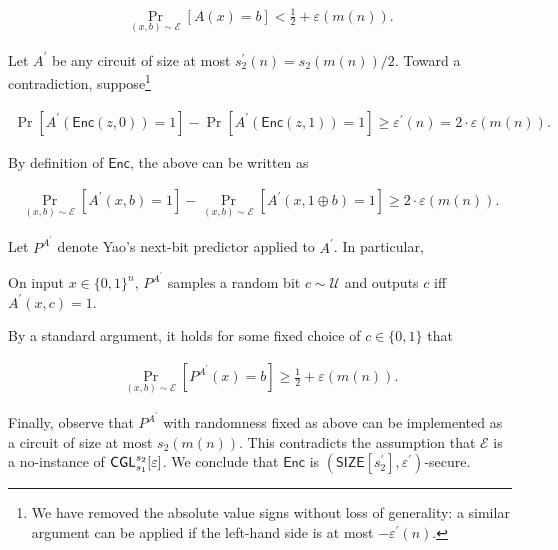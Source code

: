 \documentclass[10pt,a4paper]{article}
\begin{document}
\[\begin{gathered}
\Pr_{(x,b)\sim\mathcal{E}}[A(x)=b]<\frac{1}{2}+\varepsilon(m(n)).
\end{gathered}\]


Let $A^{\prime}$ be any circuit of size at most $s_{2}^{\prime}(n)=s_{2}(m(n))/2$. Toward a contradiction, suppose\footnote{We have removed the absolute value signs without loss of generality: a similar argument can be applied if the left-hand side is at most $-\varepsilon^{\prime}(n)$.}\par


\[\begin{gathered}
\Pr[A^{\prime}({\mathsf{Enc}}(z,0))=1]-\Pr[A^{\prime}({\mathsf{Enc}}(z,1))=1]\geq\varepsilon^{\prime}(n)=2\cdot\varepsilon(m(n)).
\end{gathered}\]


By definition of ${\mathsf{Enc}}$, the above can be written as\par


\[\begin{gathered}
\Pr_{(x,b)\sim\mathcal{E}}[A^{\prime}(x,b)=1]-\Pr_{(x,b)\sim\mathcal{E}}[A^{\prime}(x,1\oplus b)=1]\geq 2\cdot\varepsilon(m(n)).
\end{gathered}\]


Let $P^{A^{\prime}}$ denote Yao’s next-bit predictor applied to $A^{\prime}$. In particular,\par



On input $x\in\{0,1\}^{n}$, $P^{A^{\prime}}$ samples a random bit $c\sim\mathcal{U}$ and outputs $c$ iff $A^{\prime}(x,c)=1$.\par



By a standard argument, it holds for some fixed choice of $c\in\{0,1\}$ that\par


\[\begin{gathered}
\Pr_{(x,b)\sim\mathcal{E}}[P^{A^{\prime}}(x)=b]\geq\frac{1}{2}+\varepsilon(m(n)).
\end{gathered}\]


Finally, observe that $P^{A^{\prime}}$ with randomness fixed as above can be implemented as a circuit of size at most $s_{2}(m(n))$. This contradicts the assumption that $\mathcal{E}$ is a no-instance of ${\sf CGL}_{s_{1}}^{s_{2}}[\varepsilon]$. We conclude that ${\mathsf{Enc}}$ is $({\mathsf{SIZE}}[s_{2}^{\prime}],\varepsilon^{\prime})$-secure.\par
\end{document}
